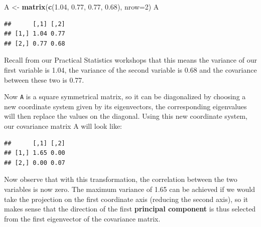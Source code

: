 \documentclass[]{article}
\newenvironment{Shaded}{\begin{snugshade}}{\end{snugshade}}
\newcommand{\DataTypeTok}[1]{\textcolor[rgb]{0.13,0.29,0.53}{#1}}
\newcommand{\DecValTok}[1]{\textcolor[rgb]{0.00,0.00,0.81}{#1}}
\newcommand{\FloatTok}[1]{\textcolor[rgb]{0.00,0.00,0.81}{#1}}
\newcommand{\KeywordTok}[1]{\textcolor[rgb]{0.13,0.29,0.53}{\textbf{#1}}}
\newcommand{\NormalTok}[1]{#1}
\newcommand{\OperatorTok}[1]{\textcolor[rgb]{0.81,0.36,0.00}{\textbf{#1}}}
\newcommand{\StringTok}[1]{\textcolor[rgb]{0.31,0.60,0.02}{#1}}
\begin{document}
\begin{Shaded}
\begin{Highlighting}[]
\NormalTok{A <-}\StringTok{ }\KeywordTok{matrix}\NormalTok{(}\KeywordTok{c}\NormalTok{(}\FloatTok{1.04}\NormalTok{, }\FloatTok{0.77}\NormalTok{, }\FloatTok{0.77}\NormalTok{, }\FloatTok{0.68}\NormalTok{), }\DataTypeTok{nrow=}\DecValTok{2}\NormalTok{)}
\NormalTok{A}
\end{Highlighting}
\end{Shaded}

\begin{verbatim}
##      [,1] [,2]
## [1,] 1.04 0.77
## [2,] 0.77 0.68
\end{verbatim}

Recall from our Practical Statistics workshops that this means the
variance of our first variable is 1.04, the variance of the second
variable is 0.68 and the covariance between these two is 0.77.

Now \texttt{A} is a square symmetrical matrix, so it can be diagonalized
by choosing a new coordinate system given by its eigenvectors, the
corresponding eigenvalues will then replace the values on the diagonal.
Using this new coordinate system, our covariance matrix A will look
like:

\begin{Shaded}
\end{Shaded}

\begin{verbatim}
##      [,1] [,2]
## [1,] 1.65 0.00
## [2,] 0.00 0.07
\end{verbatim}

Now observe that with this transformation, the correlation between the
two variables is now zero. The maximum variance of 1.65 can be achieved
if we would take the projection on the first coordinate axis (reducing
the second axis), so it makes sense that the direction of the first
\textbf{principal component} is thus selected from the first eigenvector
of the covariance matrix.
\end{document}

